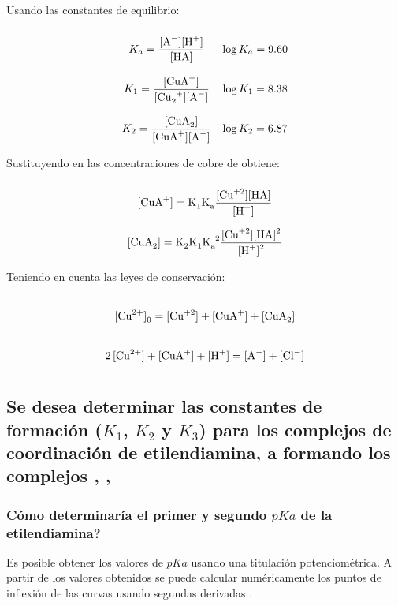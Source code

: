 \documentclass[fleqn,10pt]{SelfArx} %
\begin{document}
	Usando las constantes de equilibrio:
	\begin{equation}
	\def\arraystretch{3}
	\begin{array}{cc}
	K_a = \dfrac{\ce{[A^-][H+]}}{\ce{[HA]}} & \log K_a = 9.60 \\
	K_1 = \dfrac{\ce{[CuA+]}}{\ce{[Cu+2][A^-]}} & \log K_1 = 8.38 \\
	K_2 = \dfrac{\ce{[CuA_2]}}{\ce{[CuA+][A^-]}} & \log K_2 = 6.87 \\
	\end{array}
	\end{equation}
	
	Sustituyendo en las concentraciones de cobre de obtiene:
	\begin{equation}
	\begin{array}{c}
	\ce{[CuA+]} = \ce{K_1K_a}\dfrac{\ce{[Cu^{+2}][HA]}}{\ce{[H+]}}\\
	\ce{[CuA_2]} =  \ce{K_2K_1K_a^2}\dfrac{\ce{[Cu^{+2}][HA]^2}}{\ce{[H+]^2}}
	\end{array}
	\end{equation}
	
	Teniendo en cuenta las leyes de conservaci\'on:
	\begin{equation}
	\begin{array}{cc}
	\ce{[Cu^{2+}]_0} = \ce{[Cu^{+2}] + [CuA+] + [CuA_2]} \\
	\ce{2[Cu^{2+}] + [CuA+] + [H+]} = \ce{[A^-] + [Cl^-]}
	\end{array}
	\end{equation}
	
	\subsection{Se desea determinar las constantes de formaci\'on ($K_1$, $K_2$ y $K_3$) para los complejos de coordinaci\'on de etilendiamina, a  formando los complejos , , }
	\subsubsection{C\'omo determinar\'ia el primer y segundo $pKa$ de la etilendiamina?}
	Es posible obtener los valores de $pKa$ usando una titulaci\'on potenciom\'etrica. A partir de los valores obtenidos se puede calcular num\'ericamente los puntos de inflexi\'on de las curvas usando segundas derivadas \cite{pka determination}.
	
\end{document}
